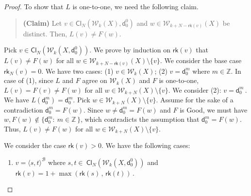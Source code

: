 \documentclass[10pt,a4paper, openany,  oldfontcommands]{memoir}
\newtheorem{open problem} [theorem] {Open Problem}
\newtheorem{open question} [theorem] {Open Question}
\begin{document}
\begin{proof}
To show that $L$ is one-to-one,  we need the following claim. 

   
   \begin{quote} {\bf (Claim)} \;\;\;\;\;\;    
   Let    $   v  \in    \mathsf{Cl}_{N}  \left(  \mathcal{W}_{k}  \left( X  \right)     ,  \mathsf{d}^0_0     \right)   $     and 
   $  w  \in  \mathcal{W}_{k + N- \mathsf{rk}  \left( v  \right)  }  \left( X  \right)    $
   be distinct. 
Then,    $ L(v)   \neq   F(w) $.
 \end{quote}  
 
 Pick   $   v  \in    \mathsf{Cl}_{N}  \left(  \mathcal{W}_{k}  \left( X    ,  \mathsf{d}^0_0    \right)   \right)   $. 
 We prove  by induction on  $  \mathsf{rk}   \left(  v  \right)  $  that  
 $  L(v)  \neq  F(w)  $  for all   $  w    \in \mathcal{W}_{k + N- \mathsf{rk}  \left( v  \right)  }  \left( X  \right)   \setminus  \lbrace  v  \rbrace  $. 
 We consider the base case   $   \mathsf{rk}_N  \left(  v  \right)  = 0  $. 
 We have two cases:   
 (1)  $  v    \in  \mathcal{W}_{k}  \left( X  \right)     $; 
 (2)  $  v  =  \mathsf{d}^m_0  $  where  $  m  \in  \mathbb{Z}  $. 
 In case of  (1),  since   $L$ and $F$ agree on   $   \mathcal{W}_{k}  \left( X  \right)     $ and  $F$  is one-to-one, 
  $  L(v)   =  F(v)   \neq    F(w)  $    for all   $  w    \in \mathcal{W}_{k + N }  \left( X  \right)   \setminus  \lbrace  v  \rbrace  $. 
   We consider (2):   $  v  =  \mathsf{d}^m_0     \,  $.
   We have  $  L(\mathsf{d}^m_0 )  =  \mathsf{d}^m_0   $. 
   Pick    $  w    \in \mathcal{W}_{k + N }  \left( X  \right)   \setminus  \lbrace  v  \rbrace  $. 
   Assume for the sake of a contradiction  $ \mathsf{d}^m_0   =  F(w)  $. 
   Since  $  w  \neq  \mathsf{d}^m_0   =  F(w)  $  and  $  F $  is  \textsf{Good},  
   we must have  $  w,  F(w)  \not\in    \big\{   \mathsf{d}^m_0  :   \    m  \in  \mathbb{Z}   \,   \big\}  $, 
   which contradicts the assumption that    $  \mathsf{d}^m_0   =  F(w)  $. 
   Thus,     $  L(v)   \neq    F(w)  $    for all   $  w    \in \mathcal{W}_{k + N }  \left( X  \right)   \setminus  \lbrace  v  \rbrace  $. 

   
   
   
   
   
We consider the case      $   \mathsf{rk}  \left(  v  \right)   >  0  $. 
We   have the following cases: 
 \begin{enumerate}
\item  $  v  =  \langle  s,  t  \rangle^{  \mathcal{B}  }  $  where  
$  s,  t  \in    \ \mathsf{Cl}_{N}  \left(  \mathcal{W}_{k}  \left( X   ,   \mathsf{d}^0_0    \right)   \right)   $
and  $  \mathsf{rk} \left(  v  \right)  =  1  +  \max\left(   \mathsf{rk} \left(  s \right)  \,  ,  \,    \mathsf{rk} \left(  t  \right)   \right)    \,   $. 





\end{enumerate}
\end{proof}
\end{document}
